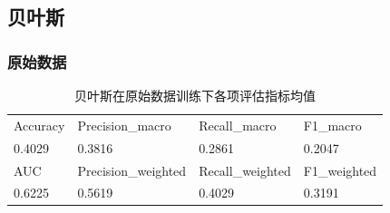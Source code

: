 \documentclass[10pt]{article}
\begin{document}
\subsection{贝叶斯}
\subsubsection*{原始数据}
\begin{table}[H]
  \centering
  \caption{贝叶斯在原始数据训练下各项评估指标均值}
  \begin{tabular}{llll}
  \toprule
  Accuracy & Precision\_macro & Recall\_macro & F1\_macro \\
  0.4029 & 0.3816 & 0.2861 & 0.2047 \\
  \midrule
  AUC & Precision\_weighted & Recall\_weighted & F1\_weighted \\
  0.6225 & 0.5619 & 0.4029 & 0.3191 \\
  \bottomrule
  \end{tabular}
\end{table}
\end{document}
